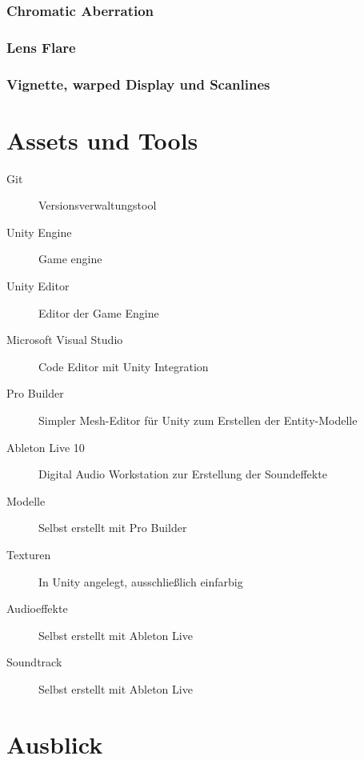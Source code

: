 \documentclass[a4paper,10pt,ngerman,fontsize=12pt]{scrreprt}
\begin{document}
\subsection{Chromatic Aberration}

\lipsum[3]



\subsection{Lens Flare}

\lipsum[3]



\subsection{Vignette, warped Display und Scanlines}

\lipsum[3]





\chapter{Assets und Tools}

\begin{description}
\item[Git] Versionsverwaltungstool
\item[Unity Engine] Game engine
\item[Unity Editor] Editor der Game Engine
\item[Microsoft Visual Studio] Code Editor mit Unity Integration
\item[Pro Builder] Simpler Mesh-Editor für Unity zum Erstellen der Entity-Modelle
\item[Ableton Live 10] Digital Audio Workstation zur Erstellung der Soundeffekte
\vspace{5mm}
\item[Modelle] Selbst erstellt mit Pro Builder
\item[Texturen] In Unity angelegt, ausschlie{\ss}lich einfarbig
\item[Audioeffekte] Selbst erstellt mit Ableton Live
\item[Soundtrack] Selbst erstellt mit Ableton Live

\end{description}






\chapter{Ausblick}
\end{document}
